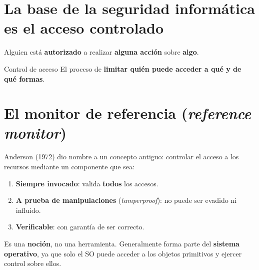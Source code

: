 \documentclass[11pt,a4paper]{report}
\begin{document}
\section{La base de la seguridad informática es el acceso controlado}
 
Alguien está \textbf{autorizado} a realizar \textbf{alguna acción} sobre \textbf{algo}.
 
\begin{definicion}{Control de acceso}
El proceso de \textbf{limitar quién puede acceder a qué y de qué formas}.
\end{definicion}
 
\section{El monitor de referencia (\emph{reference monitor})}
 
Anderson (1972) dio nombre a un concepto antiguo: controlar el acceso a los recursos mediante un componente que sea:
 
\begin{enumerate}
  \item \textbf{Siempre invocado}: valida \textbf{todos} los accesos.
  \item \textbf{A prueba de manipulaciones} (\emph{tamperproof}): no puede ser evadido ni influido.
  \item \textbf{Verificable}: con garantía de ser correcto.
\end{enumerate}
 
\begin{center}
\end{center}
 
\begin{importante}
Es una \textbf{noción}, no una herramienta. Generalmente forma parte del \textbf{sistema operativo}, ya que solo el SO puede acceder a los objetos primitivos y ejercer control sobre ellos.
\end{importante}
 
\end{document}
